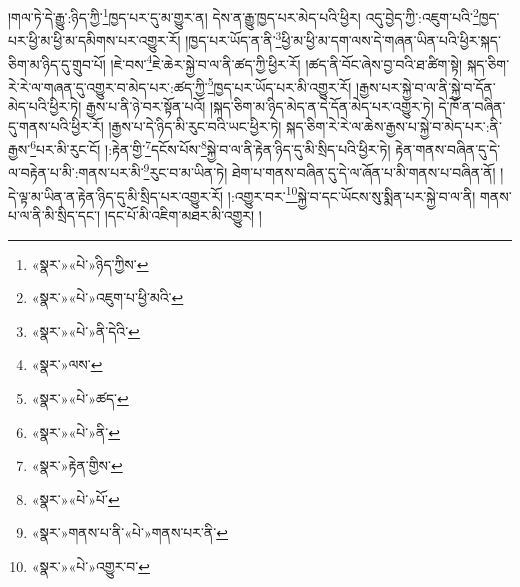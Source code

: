 །གལ་ཏེ་དེ་རྒྱུ་:ཉིད་ཀྱི་\footnote{«སྣར་»«པེ་»ཉིད་ཀྱིས་}ཁྱད་པར་དུ་མ་གྱུར་ན། དེས་ན་རྒྱུ་ཁྱད་པར་མེད་པའི་ཕྱིར། འདུ་བྱེད་ཀྱི་:འཇུག་པའི་\footnote{«སྣར་»«པེ་»འཇུག་པ་ཕྱི་མའི་}ཁྱད་པར་ཕྱི་མ་ཕྱི་མ་དམིགས་པར་འགྱུར་རོ། །ཁྱད་པར་ཡོད་ན་ནི་\footnote{«སྣར་»«པེ་»ནི་དེའི་}ཕྱི་མ་ཕྱི་མ་དག་ལས་དེ་གཞན་ཡིན་པའི་ཕྱིར་སྐད་ཅིག་མ་ཉིད་དུ་གྲུབ་པོ། །ཇེ་བས་\footnote{«སྣར་»ལས་}ཇེ་ཆེར་སྐྱེ་བ་ལ་ནི་ཚད་ཀྱི་ཕྱིར་རོ། །ཚད་ནི་བོང་ཞེས་བྱ་བའི་ཐ་ཚིག་སྟེ། སྐད་ཅིག་རེ་རེ་ལ་གཞན་དུ་འགྱུར་བ་མེད་པར་:ཚད་ཀྱི་\footnote{«སྣར་»«པེ་»ཚད་}ཁྱད་པར་ཡོད་པར་མི་འགྱུར་རོ། །རྒྱས་པར་སྐྱེ་བ་ལ་ནི་སྐྱེ་བ་དོན་མེད་པའི་ཕྱིར་ཏེ། རྒྱས་པ་ནི་ཉེ་བར་སྟོན་པའོ། །སྐད་ཅིག་མ་ཉིད་མེད་ན་དེ་དོན་མེད་པར་འགྱུར་ཏེ། དེ་ཁོ་ན་བཞིན་དུ་གནས་པའི་ཕྱིར་རོ། །རྒྱས་པ་དེ་ཉིད་མི་རུང་བའི་ཡང་ཕྱིར་ཏེ། སྐད་ཅིག་རེ་རེ་ལ་ཆེས་རྒྱས་པ་སྐྱེ་བ་མེད་པར་:ནི་རྒྱས་\footnote{«སྣར་»«པེ་»ནི་}པར་མི་རུང་ངོ། །:རྟེན་གྱི་\footnote{«སྣར་»རྟེན་གྱིས་}དངོས་པོས་\footnote{«སྣར་»«པེ་»པོ་}སྐྱེ་བ་ལ་ནི་རྟེན་ཉིད་དུ་མི་སྲིད་པའི་ཕྱིར་ཏེ། རྟེན་གནས་བཞིན་དུ་དེ་ལ་བརྟེན་པ་མི་:གནས་པར་མི་\footnote{«སྣར་»གནས་པ་ནི་«པེ་»གནས་པར་ནི་}རུང་བ་མ་ཡིན་ཏེ། ཐེག་པ་གནས་བཞིན་དུ་དེ་ལ་ཞོན་པ་མི་གནས་པ་བཞིན་ནོ། །དེ་ལྟ་མ་ཡིན་ན་རྟེན་ཉིད་དུ་མི་སྲིད་པར་འགྱུར་རོ། །:འགྱུར་བར་\footnote{«སྣར་»«པེ་»འགྱུར་བ་}སྐྱེ་བ་དང་ཡོངས་སུ་སྨིན་པར་སྐྱེ་བ་ལ་ནི། གནས་པ་ལ་ནི་མི་སྲིད་དང་། །དང་པོ་མི་འཇིག་མཐར་མི་འགྱུར། །
